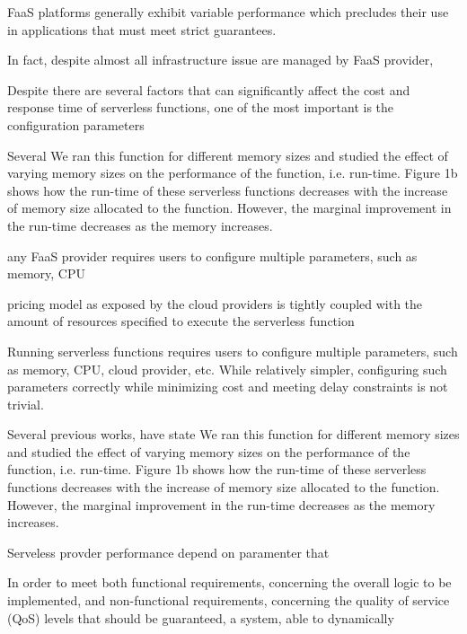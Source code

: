 \documentclass[12pt,a4paper]{report}
\begin{document}
FaaS platforms generally exhibit variable performance which precludes their use in applications that must meet strict guarantees.



In fact, despite almost all infrastructure issue are managed by FaaS provider,

Despite there are several factors that can significantly affect the cost and response time of serverless functions, one of the most important is the configuration parameters

Several 
We ran this
function for different memory sizes and studied the effect of
varying memory sizes on the performance of the function, i.e.
run-time. Figure 1b shows how the run-time of these serverless
functions decreases with the increase of memory size allocated
to the function. However, the marginal improvement in the
run-time decreases as the memory increases.



any FaaS provider  requires users to configure
multiple parameters, such as memory, CPU



pricing model as exposed by the cloud providers
is tightly coupled with the amount of resources specified
to execute the serverless function 




Running serverless functions requires users to configure
multiple parameters, such as memory, CPU, cloud provider, etc.
While relatively simpler, configuring such parameters correctly
while minimizing cost and meeting delay constraints is not
trivial. 




Several previous works, have state We ran this
function for different memory sizes and studied the effect of
varying memory sizes on the performance of the function, i.e.
run-time. Figure 1b shows how the run-time of these serverless
functions decreases with the increase of memory size allocated
to the function. However, the marginal improvement in the
run-time decreases as the memory increases. 







Serveless provder performance depend on paramenter that 



In order to meet both functional requirements, concerning the overall logic to be implemented, and non-functional requirements, concerning the quality of service (QoS) levels that should be guaranteed, a system, able to dynamically 
\end{document}

